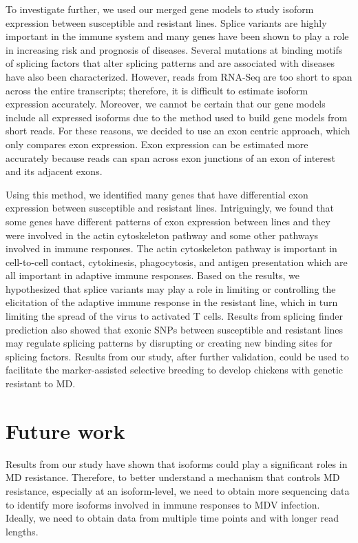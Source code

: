 To investigate further, we used our merged gene models to
study isoform expression between susceptible and resistant
lines. Splice variants are highly important in the immune
system and many genes have been shown to play a role in
increasing risk and prognosis of diseases. Several mutations
at binding motifs of splicing factors that alter splicing
patterns and are associated with diseases have also been
characterized. However, reads from RNA-Seq are too short to
span across the entire transcripts; therefore, it is
difficult to estimate isoform expression accurately.
Moreover, we cannot be certain that our gene models include
all expressed isoforms due to the method used to build gene
models from short reads. For these reasons, we decided to
use an exon centric approach, which only compares exon
expression. Exon expression can be estimated more accurately
because reads can span across exon junctions of an exon of
interest and its adjacent exons.

Using this method, we identified many genes that have
differential exon expression between susceptible and
resistant lines. Intriguingly, we found that some genes
have different patterns of exon expression between lines and
they were involved in the actin cytoskeleton pathway and some
other pathways involved in immune responses.
The actin cytoskeleton pathway is important in cell-to-cell
contact, cytokinesis, phagocytosis, and antigen presentation
which are all important in adaptive immune responses.
Based on the results, we hypothesized that splice
variants may play a role in limiting or controlling the
elicitation of the adaptive immune response in the resistant
line, which in turn limiting the spread of the virus to
activated T cells. Results from splicing finder prediction
also showed that exonic SNPs between susceptible and
resistant lines may regulate splicing patterns by disrupting
or creating new binding sites for splicing factors. Results
from our study, after further validation, could be used to
facilitate the marker-assisted selective breeding to develop
chickens with genetic resistant to MD.

\section{Future work}

Results from our study have shown that isoforms could play a
significant roles in MD resistance. Therefore, to better
understand a mechanism that controls MD resistance,
especially at an isoform-level, we need to obtain more
sequencing data to identify more isoforms involved in immune
responses to MDV infection. Ideally, we need to obtain data
from multiple time points and with longer read lengths.

